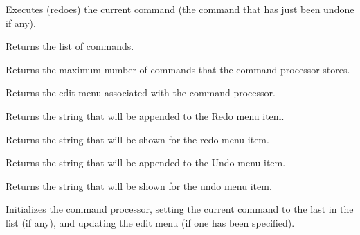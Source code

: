 Executes (redoes) the current command (the command that has just been undone if any).

\label{wxcommandprocessorgetcommands}


Returns the list of commands.

\label{wxcommandprocessorgetmaxcommands}


Returns the maximum number of commands that the command processor stores.

\label{wxcommandprocessorgeteditmenu}


Returns the edit menu associated with the command processor.

\label{wxcommandprocessorgetredoaccelerator}


Returns the string that will be appended to the Redo menu item.

\label{wxcommandprocessorgetredomenulabel}


Returns the string that will be shown for the redo menu item.

\label{wxcommandprocessorgetundoaccelerator}


Returns the string that will be appended to the Undo menu item.

\label{wxcommandprocessorgetundomenulabel}


Returns the string that will be shown for the undo menu item.

\label{wxcommandprocessorinitialize}


Initializes the command processor, setting the current command to the
last in the list (if any), and updating the edit menu (if one has been
specified).

